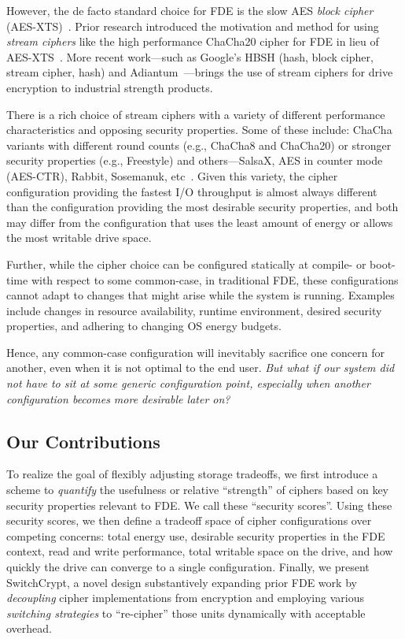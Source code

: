 However, the de facto standard choice for FDE is the slow AES \emph{block
cipher} (AES-XTS)~\cite{AES, AES-XTS}. Prior research introduced the motivation
and method for using \emph{stream ciphers} like the high performance ChaCha20
cipher for FDE in lieu of AES-XTS~\cite{StrongBox, ChaCha20}. More recent
work---such as Google's HBSH (hash, block cipher, stream cipher, hash) and
Adiantum~\cite{HBSH, Adiantum}---brings the use of stream ciphers for drive
encryption to industrial strength products.

There is a rich choice of stream ciphers with a variety of different performance
characteristics and opposing security properties. Some of these include: ChaCha
variants with different round counts (e.g., ChaCha8 and ChaCha20) or stronger
security properties (e.g., Freestyle) and others---SalsaX, AES in counter mode
(AES-CTR), Rabbit, Sosemanuk, etc~\cite{Freestyle, SalsaX, Rabbit, Sosemanuk,
ChaCha20, AES-CTR}. Given this variety, the cipher configuration providing the
fastest I/O throughput is almost always different than the configuration
providing the most desirable security properties, and both may differ from the
configuration that uses the least amount of energy or allows the most writable
drive space.

Further, while the cipher choice can be configured statically at compile- or
boot-time with respect to some common-case, in traditional FDE, these
configurations cannot adapt to changes that might arise while the system is
running. Examples include changes in resource availability, runtime environment,
desired security properties, and adhering to changing OS energy budgets.

Hence, any common-case configuration will inevitably sacrifice one concern for
another, even when it is not optimal to the end user. \emph{But what if our
system did not have to sit at some generic configuration point, especially when
another configuration becomes more desirable later on?}

\subsection{Our Contributions}

To realize the goal of flexibly adjusting storage tradeoffs, we first introduce
a scheme to \emph{quantify} the usefulness or relative ``strength'' of ciphers
based on key security properties relevant to FDE. We call these ``security
scores''. Using these security scores, we then define a tradeoff space of cipher
configurations over competing concerns: total energy use, desirable security
properties in the FDE context, read and write performance, total writable space
on the drive, and how quickly the drive can converge to a single configuration.
Finally, we present SwitchCrypt, a novel design substantively expanding prior
FDE work by \emph{decoupling} cipher implementations from encryption and
employing various \emph{switching strategies} to ``re-cipher'' those units
dynamically with acceptable overhead.


